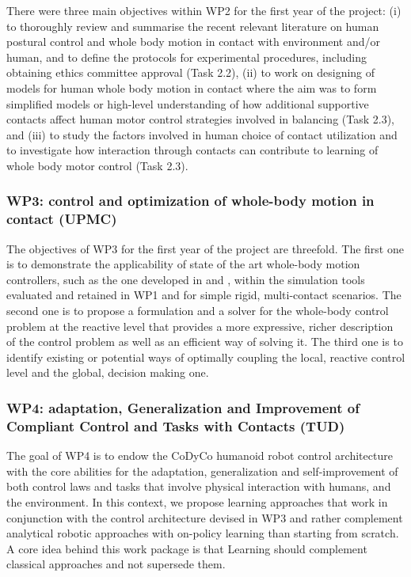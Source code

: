 \documentclass[12pt,a4paper,twoside]{article}
\begin{document}
There were three main objectives within WP2 for the first year of the project: (i) to thoroughly review and summarise the recent relevant literature on human postural control and whole body motion in contact with environment and/or human, and to define the protocols for experimental procedures, including obtaining ethics committee approval (Task 2.2), (ii) to work on designing of models for human whole body motion in contact where the aim was to form simplified models or high-level understanding of how additional supportive contacts affect human motor control strategies involved in balancing (Task 2.3), and (iii) to study the factors involved in human choice of contact utilization and to investigate how interaction through contacts can contribute to learning of whole body motor control (Task 2.3).

\subsubsection{WP3: control and optimization of whole-body motion in contact (UPMC)}

The objectives of WP3 for the first year of the project are threefold. The first one is to demonstrate the applicability of state of the art whole-body motion controllers, such as the one developed in \cite{salini2012} and \cite{delprete2013}, within the simulation tools evaluated and retained in WP1 and for simple rigid, multi-contact scenarios. The second one is to propose a formulation and a solver for the whole-body control problem at the reactive level that provides a more expressive, richer description of the control problem as well as an efficient way of solving it. The third one is to identify existing or potential ways of optimally coupling the local, reactive control level and the global, decision making one.

\subsubsection{WP4: adaptation, Generalization and Improvement of Compliant Control and Tasks with Contacts (TUD)}

The goal of WP4 is to endow the CoDyCo humanoid robot control architecture with the core abilities for the
adaptation, generalization and self-improvement of both control laws and tasks that involve physical interaction
with humans, and the environment. In this context, we propose learning approaches that work in conjunction
with the control architecture devised in WP3 and rather complement analytical robotic approaches with on-policy
learning than starting from scratch. A core idea behind this work package is that Learning should complement
classical approaches and not supersede them.
\end{document}
